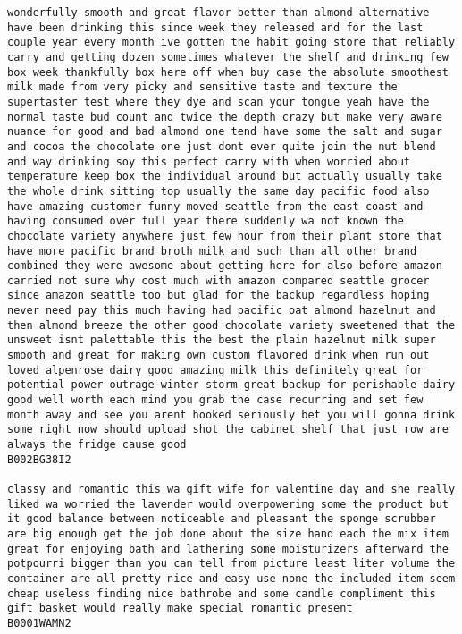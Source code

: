 \documentclass[11pt]{article}
\begin{document}
\begin{Verbatim}[commandchars=\\\{\}]
wonderfully smooth and great flavor better than almond alternative have been drinking this since week they released and for the last couple year every month ive gotten the habit going store that reliably carry and getting dozen sometimes whatever the shelf and drinking few box week thankfully box here off when buy case the absolute smoothest milk made from very picky and sensitive taste and texture the supertaster test where they dye and scan your tongue yeah have the normal taste bud count and twice the depth crazy but make very aware nuance for good and bad almond one tend have some the salt and sugar and cocoa the chocolate one just dont ever quite join the nut blend and way drinking soy this perfect carry with when worried about temperature keep box the individual around but actually usually take the whole drink sitting top usually the same day pacific food also have amazing customer funny moved seattle from the east coast and having consumed over full year there suddenly wa not known the chocolate variety anywhere just few hour from their plant store that have more pacific brand broth milk and such than all other brand combined they were awesome about getting here for also before amazon carried not sure why cost much with amazon compared seattle grocer since amazon seattle too but glad for the backup regardless hoping never need pay this much having had pacific oat almond hazelnut and then almond breeze the other good chocolate variety sweetened that the unsweet isnt palettable this the best the plain hazelnut milk super smooth and great for making own custom flavored drink when run out loved alpenrose dairy good amazing milk this definitely great for potential power outrage winter storm great backup for perishable dairy good well worth each mind you grab the case recurring and set few month away and see you arent hooked seriously bet you will gonna drink some right now should upload shot the cabinet shelf that just row are always the fridge cause good
B002BG38I2

classy and romantic this wa gift wife for valentine day and she really liked wa worried the lavender would overpowering some the product but it good balance between noticeable and pleasant the sponge scrubber are big enough get the job done about the size hand each the mix item great for enjoying bath and lathering some moisturizers afterward the potpourri bigger than you can tell from picture least liter volume the container are all pretty nice and easy use none the included item seem cheap useless finding nice bathrobe and some candle compliment this gift basket would really make special romantic present
B0001WAMN2


\end{Verbatim}
\end{document}
